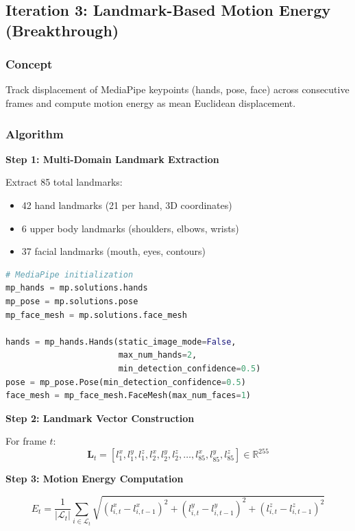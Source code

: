 \documentclass[11pt,a4paper]{article}
\begin{document}
\subsection{Iteration 3: Landmark-Based Motion Energy (Breakthrough)}

\subsubsection{Concept}

Track displacement of MediaPipe keypoints (hands, pose, face) across consecutive frames and compute motion energy as mean Euclidean displacement.

\subsubsection{Algorithm}

\textbf{Step 1: Multi-Domain Landmark Extraction}

Extract 85 total landmarks:
\begin{itemize}
    \item 42 hand landmarks (21 per hand, 3D coordinates)
    \item 6 upper body landmarks (shoulders, elbows, wrists)
    \item 37 facial landmarks (mouth, eyes, contours)
\end{itemize}

\begin{lstlisting}[language=Python]
# MediaPipe initialization
mp_hands = mp.solutions.hands
mp_pose = mp.solutions.pose
mp_face_mesh = mp.solutions.face_mesh

hands = mp_hands.Hands(static_image_mode=False, 
                       max_num_hands=2,
                       min_detection_confidence=0.5)
pose = mp_pose.Pose(min_detection_confidence=0.5)
face_mesh = mp_face_mesh.FaceMesh(max_num_faces=1)
\end{lstlisting}

\textbf{Step 2: Landmark Vector Construction}

For frame $t$:
\begin{equation}
\mathbf{L}_t = [l_1^x, l_1^y, l_1^z, l_2^x, l_2^y, l_2^z, \ldots, l_{85}^x, l_{85}^y, l_{85}^z] \in \mathbb{R}^{255}
\end{equation}

\textbf{Step 3: Motion Energy Computation}

\begin{equation}
E_t = \frac{1}{|\mathcal{L}_t|} \sum_{i \in \mathcal{L}_t} \sqrt{(l_{i,t}^x - l_{i,t-1}^x)^2 + (l_{i,t}^y - l_{i,t-1}^y)^2 + (l_{i,t}^z - l_{i,t-1}^z)^2}
\end{equation}
\end{document}
